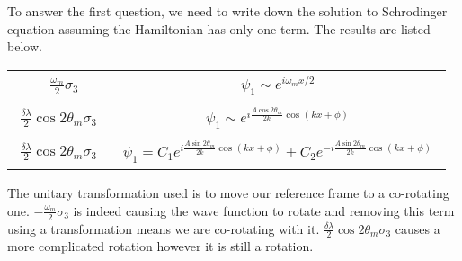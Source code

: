 \documentclass[letterpaper,12pt,english]{sphinxmanual}
\begin{document}
To answer the first question, we need to write down the solution to Schrodinger equation assuming the Hamiltonian has only one term. The results are listed below.

\noindent\begin{tabulary}{\linewidth}{|L|L|}
\hline
{}\relax &\relax \\
\hline\begin{equation*}
\begin{split}-\frac{\omega_m}{2}\sigma_3\end{split}
\end{equation*}&\begin{equation*}
\begin{split}\psi_1 \sim e^{i\omega_m x/2}\end{split}
\end{equation*}\\
\hline\begin{equation*}
\begin{split}\frac{\delta\lambda}{2}\cos 2\theta_m \sigma_3\end{split}
\end{equation*}&\begin{equation*}
\begin{split}\psi_1 \sim e^{i\frac{A\cos 2\theta_m}{2k}\cos(kx+\phi)}\end{split}
\end{equation*}\\
\hline\begin{equation*}
\begin{split}\frac{\delta\lambda}{2}\cos 2\theta_m \sigma_3\end{split}
\end{equation*}&\begin{equation*}
\begin{split}\psi_1 = C_1 e^{i\frac{A\sin 2\theta_m}{2k}\cos(kx+\phi)} + C_2 e^{-i\frac{A\sin 2\theta_m}{2k}\cos(kx+\phi)}\end{split}
\end{equation*}\\
\hline\end{tabulary}


The unitary transformation used is to move our reference frame to a co-rotating one. \(-\frac{\omega_m}{2}\sigma_3\) is indeed causing the wave function to rotate and removing this term using a transformation means we are co-rotating with it. \(\frac{\delta\lambda}{2}\cos 2\theta_m \sigma_3\) causes a more complicated rotation however it is still a rotation.
\end{document}
